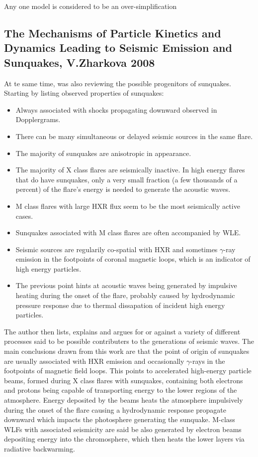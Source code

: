 Any one model is considered to be an over-simplification

\subsection{The Mechanisms of Particle Kinetics and Dynamics Leading to Seismic Emission and Sunquakes, V.Zharkova 2008}
At te same time, \cite{2008SoPh..251..641Z} was also reviewing the possible progenitors of sunquakes. Starting by listing observed properties of sunquakes:
\begin{itemize}
\item Always associated with shocks propagating downward observed in Dopplergrams.
\item There can be many simultaneous or delayed seismic sources in the same flare.
\item The majority of sunquakes are anisotropic in appearance.
\item The majority of X class flares are seismically inactive. In high energy flares that do have sunquakes, only a very small fraction (a few thousands of a percent) of the flare's energy is needed to generate the acoustic waves. 
\item M class flares with large HXR flux seem to be the most seismically active cases.
\item Sunquakes associated with M class flares are often accompanied by WLE.
\item Seismic sources are regularily co-spatial with HXR and sometimes $\gamma$-ray emission in the footpoints of coronal magnetic loops, which is an indicator of high energy particles.
\item The previous point hints at acoustic waves being generated by impulsive heating during the onset of the flare, probably caused by hydrodynamic pressure response due to thermal dissapation of incident high energy particles.
\end{itemize}
The author then lists, explains and argues for or against a variety of different processes said to be possible contributers to the generations of seismic waves. The main conclusions drawn from this work are that the point of origin of sunquakes are usually associated with HXR emission and occasionally $\gamma$-rays in the footpoints of magnetic field loops. This points to accelerated high-energy particle beams, formed during X class flares with sunquakes, containing both electrons and protons being capable of transporting energy to the lower regions of the atmosphere. Energy deposited by the beams heats the atmosphere impulsively during the onset of the flare causing a hydrodynamic response propagate downward which impacts the photosphere generating the sunquake. M-class WLFs with associated seismicity are said be also generated by electron beams depositing energy into the chromosphere, which then heats the lower layers via radiative backwarming.


